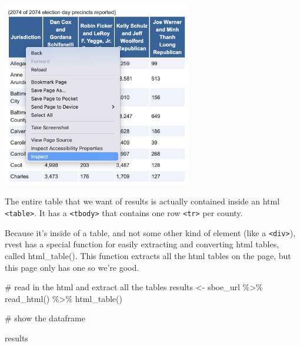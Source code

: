 \documentclass[
  letterpaper,
  DIV=11,
  numbers=noendperiod]{scrreprt}
\newenvironment{Shaded}{\begin{snugshade}}{\end{snugshade}}
\newcommand{\CommentTok}[1]{\textcolor[rgb]{0.37,0.37,0.37}{#1}}
\newcommand{\FunctionTok}[1]{\textcolor[rgb]{0.28,0.35,0.67}{#1}}
\newcommand{\NormalTok}[1]{\textcolor[rgb]{0.00,0.23,0.31}{#1}}
\newcommand{\OtherTok}[1]{\textcolor[rgb]{0.00,0.23,0.31}{#1}}
\newcommand{\SpecialCharTok}[1]{\textcolor[rgb]{0.37,0.37,0.37}{#1}}
\begin{document}
\includegraphics[width=3.27in,height=\textheight]{./images/rvest4.png}

The entire table that we want of results is actually contained inside an
html \texttt{\textless{}table\textgreater{}}. It has a
\texttt{\textless{}tbody\textgreater{}} that contains one row
\texttt{\textless{}tr\textgreater{}} per county.

Because it's inside of a table, and not some other kind of element (like
a \texttt{\textless{}div\textgreater{}}), rvest has a special function
for easily extracting and converting html tables, called html\_table().
This function extracts all the html tables on the page, but this page
only has one so we're good.

\begin{Shaded}
\begin{Highlighting}[]
\CommentTok{\# read in the html and extract all the tables}
\NormalTok{results }\OtherTok{\textless{}{-}}\NormalTok{ sboe\_url }\SpecialCharTok{\%\textgreater{}\%}
  \FunctionTok{read\_html}\NormalTok{() }\SpecialCharTok{\%\textgreater{}\%}
  \FunctionTok{html\_table}\NormalTok{()}

\CommentTok{\# show the dataframe}

\NormalTok{results}
\end{Highlighting}
\end{Shaded}
\end{document}
